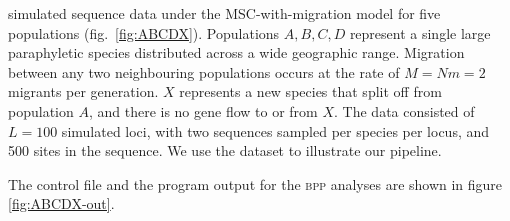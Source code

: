 \documentclass[A4]{article1}
\begin{document}
\citet{Leache2019} simulated sequence data under the MSC-with-migration model for five
populations (fig.~\ref{fig:ABCDX}).  Populations $A, B, C, D$ represent a single
large paraphyletic species distributed across a wide geographic range.  Migration
between any two neighbouring populations occurs at the rate of $M = Nm = 2$ migrants per
generation. $X$ represents a new species that split off from population $A$, and there
is no gene flow to or from $X$.  The data consisted of $L=100$
simulated loci, with two sequences sampled per species per locus, and 500 sites in the
sequence.  We use the dataset to illustrate our pipeline. 

The control file and the
program output for the \textsc{bpp} analyses are shown in figure \ref{fig:ABCDX-out}.

\begin{figure}[h]
	\begin{center}

\end{center}
\end{figure}
\end{document}
